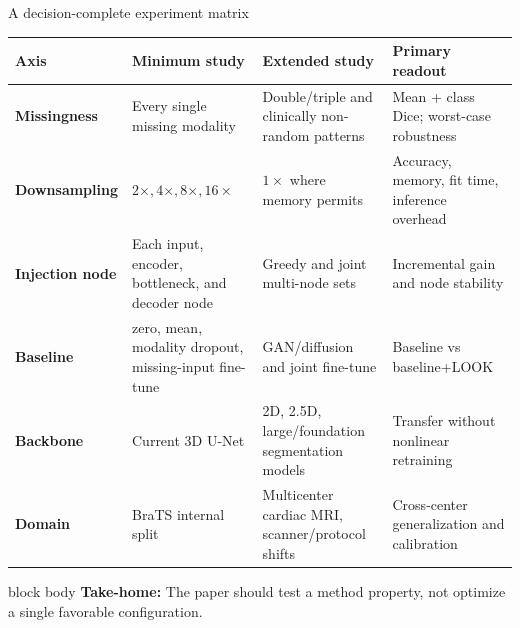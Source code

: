 \documentclass[aspectratio=169,11pt]{beamer}
\newcommand{\takeaway}[1]{%
  \vfill
  \begin{beamercolorbox}[rounded=true,sep=0.7ex,leftskip=0.8ex]{block body}%
    \textbf{Take-home:} #1
  \end{beamercolorbox}%
}
\begin{document}
\begin{frame}{A decision-complete experiment matrix}
  \scriptsize
  \begin{tabularx}{\textwidth}{>{\bfseries\color{LookNavy}}p{2.4cm} Y Y Y}
    \toprule
    Axis & Minimum study & Extended study & Primary readout \\
    \midrule
    Missingness & Every single missing modality & Double/triple and clinically non-random patterns
      & Mean + class Dice; worst-case robustness \\
    Downsampling & $2\times,4\times,8\times,16\times$ & $1\times$ where memory permits
      & Accuracy, memory, fit time, inference overhead \\
    Injection node & Each input, encoder, bottleneck, and decoder node & Greedy and joint multi-node sets
      & Incremental gain and node stability \\
    Baseline & zero, mean, modality dropout, missing-input fine-tune & GAN/diffusion and joint fine-tune
      & Baseline vs baseline+LOOK \\
    Backbone & Current 3D U-Net & 2D, 2.5D, large/foundation segmentation models
      & Transfer without nonlinear retraining \\
    Domain & BraTS internal split & Multicenter cardiac MRI, scanner/protocol shifts
      & Cross-center generalization and calibration \\
    \bottomrule
  \end{tabularx}
  \takeaway{The paper should test a method property, not optimize a single favorable configuration.}
\end{frame}
\end{document}
